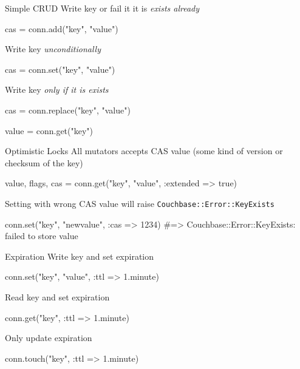 \documentclass[aspectratio=43,handout]{beamer}
\begin{document}
\begin{frame}[fragile]{Simple CRUD}
  Write key or fail it it is \itshape{exists already}
  \begin{semiverbatim}
    cas = conn.\alert{add}("key", "value")
  \end{semiverbatim}
  Write key \itshape{unconditionally}
  \begin{semiverbatim}
    cas = conn.\alert{set}("key", "value")
  \end{semiverbatim}
  Write key \itshape{only if} it is \itshape{exists}
  \begin{semiverbatim}
    cas = conn.\alert{replace}("key", "value")
  \end{semiverbatim}
  \begin{semiverbatim}
    value = conn.\alert{get}("key")
  \end{semiverbatim}
\end{frame}

\begin{frame}[fragile]{Optimistic Locks}
  All mutators accepts CAS value (some kind of version or checksum of the key)

  \begin{semiverbatim}
    value, flags, \alert{cas} = conn.get("key", "value",
                                 \alert{:extended => true})
  \end{semiverbatim}

  Setting with wrong CAS value will raise \texttt{Couchbase::Error::KeyExists}

  \begin{semiverbatim}
    conn.set("key", "newvalue", \alert{:cas => 1234})
    \#=> Couchbase::Error::KeyExists: failed to store value
  \end{semiverbatim}
\end{frame}

\begin{frame}[fragile]{Expiration}
  Write key and set expiration
  \begin{semiverbatim}
    conn.set("key", "value", \alert{:ttl => 1.minute})
  \end{semiverbatim}

  Read key and set expiration
  \begin{semiverbatim}
    conn.get("key", \alert{:ttl => 1.minute})
  \end{semiverbatim}

  Only update expiration
  \begin{semiverbatim}
    conn.\alert{touch}("key", \alert{:ttl => 1.minute})
  \end{semiverbatim}
\end{frame}
\end{document}
